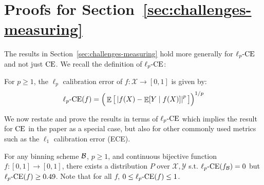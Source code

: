 \newpage
\section{Proofs for Section~\ref{sec:challenges-measuring}}
\label{sec:appendix-platt-not-calibrated}



The results in Section~\ref{sec:challenges-measuring} hold more generally for $\ell_p\textup{-CE}{}$ and not just $\textup{CE}{}$. We recall the definition of $\ell_p\textup{-CE}{}$:
\begin{definition}
For $p \geq 1$, the $\ell_p$ calibration error of $f : \mathcal{X} \to [0, 1]$ is given by:
\begin{align}
\ell_p\textup{-CE}(f) = \Big(\mathop{\mathbb{E}}\big[ \left|f(X) - \mathop{\mathbb{E}}[Y \mid f(X)] \right|^p \big] \Big)^{1/p}
\end{align}
\end{definition}

We now restate and prove the results in terms of $\ell_p\textup{-CE}{}$ which implies the result for $\textup{CE}{}$ in the paper as a special case, but also for other commonly used metrics such as the $\ell_1$ calibration error (ECE).

\begin{continuousNotCalibrated}
For any binning scheme $\mathcal{B}{}$, $p \geq 1$, and continuous bijective function $f : [0, 1] \to [0, 1]$, there exists a distribution $P$ over $\mathcal{X}, \mathcal{Y}$ s.t. $\ell_p\textup{-CE}(f_{\mathcal{B}{}}) = 0$ but $\ell_p\textup{-CE}(f) \geq 0.49$.
Note that for all $f$, $0 \leq \ell_p\textup{-CE}(f) \leq 1$.
\end{continuousNotCalibrated}

